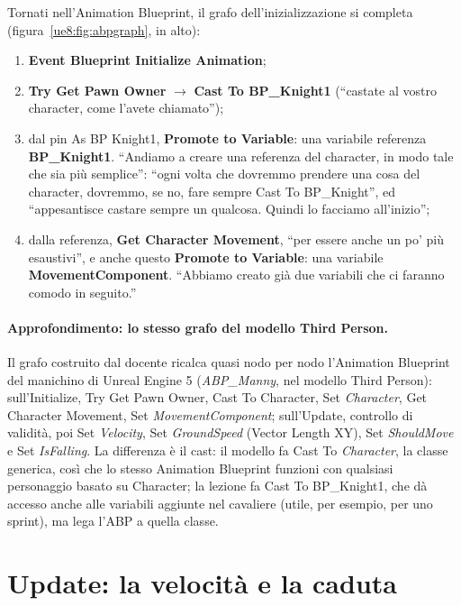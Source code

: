 Tornati nell'Animation Blueprint, il grafo dell'inizializzazione si completa
(figura~\ref{ue8:fig:abpgraph}, in alto):
\begin{enumerate}
  \item \textbf{Event Blueprint Initialize Animation};
  \item \textbf{Try Get Pawn Owner} $\rightarrow$ \textbf{Cast To BP\_Knight1}
        (``castate al vostro character, come l'avete chiamato'');
  \item dal pin As BP Knight1, \textbf{Promote to Variable}: una variabile referenza
        \textbf{BP\_Knight1}. ``Andiamo a creare una referenza del character, in modo
        tale che sia più semplice'': ``ogni volta che dovremmo prendere una cosa del
        character, dovremmo, se no, fare sempre Cast To BP\_Knight'', ed ``appesantisce
        castare sempre un qualcosa. Quindi lo facciamo all'inizio'';
  \item dalla referenza, \textbf{Get Character Movement}, ``per essere anche un po' più
        esaustivi'', e anche questo \textbf{Promote to Variable}: una variabile
        \textbf{MovementComponent}. ``Abbiamo creato già due variabili che ci faranno
        comodo in seguito.''
\end{enumerate}

\paragraph{Approfondimento: lo stesso grafo del modello Third Person.} Il grafo costruito
dal docente ricalca quasi nodo per nodo l'Animation Blueprint del manichino di Unreal
Engine 5 (\emph{ABP\_Manny}, nel modello Third Person): sull'Initialize, Try Get Pawn
Owner, Cast To Character, Set \emph{Character}, Get Character Movement, Set
\emph{MovementComponent}; sull'Update, controllo di validità, poi Set \emph{Velocity},
Set \emph{GroundSpeed} (Vector Length XY), Set \emph{ShouldMove} e Set \emph{IsFalling}.
La differenza è il cast: il modello fa Cast To \emph{Character}, la classe generica,
così che lo stesso Animation Blueprint funzioni con qualsiasi personaggio basato su
Character; la lezione fa Cast To BP\_Knight1, che dà accesso anche alle variabili
aggiunte nel cavaliere (utile, per esempio, per uno sprint), ma lega l'ABP a quella
classe.

\section{Update: la velocità e la caduta}
\label{ue8:sec:update}


